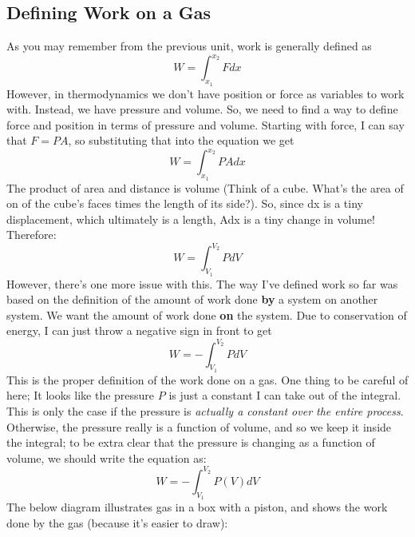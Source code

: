 \subsection{Defining Work on a Gas}
As you may remember from the previous unit, work is generally defined as
\begin{equation}
    W = \int_{x_1}^{x_2} Fdx
\end{equation}
However, in thermodynamics we don't have position or force as variables to work with. Instead, we have pressure and volume. So, we need to find a way to define force and position in terms of pressure and volume. Starting with force, I can say that $F = PA$, so substituting that into the equation we get
\begin{equation*}
    W = \int_{x_1}^{x_2} PAdx
\end{equation*}
The product of area and distance is volume (Think of a cube. What's the area of on of the cube's faces times the length of its side?). So, since dx is a tiny displacement, which ultimately is a length, Adx is a tiny change in volume! Therefore:
\begin{equation*}
    W = \int_{V_1}^{V_2} PdV
\end{equation*}
However, there's one more issue with this. The way I've defined work so far was based on the definition of the amount of work done \textbf{by} a system on another system. We want the amount of work done \textbf{on} the system. Due to conservation of energy, I can just throw a negative sign in front to get
\begin{equation}
    W = -\int_{V_1}^{V_2} PdV
\end{equation}
This is the proper definition of the work done on a gas. One thing to be careful of here; It looks like the pressure $P$ is just a constant I can take out of the integral. This is only the case if the pressure is \textit{actually a constant over the entire process}. Otherwise, the pressure really is a function of volume, and so we keep it inside the integral; to be extra clear that the pressure is changing as a function of volume, we should write the equation as:
\begin{equation}
    \label{eqn:(16)}
    W = -\int_{V_1}^{V_2} P(V)dV
\end{equation}
The below diagram illustrates gas in a box with a piston, and shows the work done by the gas (because it's easier to draw):
